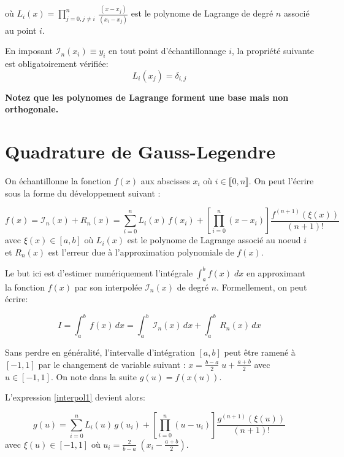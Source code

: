 \documentclass[a4paper, 10pt]{article}
\begin{document}
où $L_i(x) = \prod_{j=0, j \ne i}^n \,\frac{ (x-x_j) }{ (x_i-x_j) }$ est le polynome de Lagrange de degré $n$ associé au point $i$.

En imposant $\mathscr{I}_n(x_i) \equiv y_i$  en tout point d'échantillonnage $i$, la propriété suivante est obligatoirement vérifiée:
\begin{equation}
L_i(x_j)=\delta_{i,j}
\label{unite}
\end{equation}

\textbf{Notez que les polynomes de Lagrange  forment une base mais non orthogonale.}

\section{Quadrature de Gauss-Legendre}

On échantillonne la fonction $f(x)$ aux abscisses $x_i$ où $i \in  \llbracket  0, n  \rrbracket $.
On peut l'écrire sous la forme du développement suivant :

\begin{equation}
f(x) = \mathscr{I}_n(x) + R_n(x) = \sum_{i=0}^{n} L_i(x) \, f(x_i) + \left[ \prod_{i=0}^n (x-x_i) \right] \frac{f^{(n+1)}(\xi(x))}{(n+1)!}
\label{interpol1}
\end{equation}
avec $\xi(x) \in [a, b]$
où $L_i(x)$ est le polynome de Lagrange associé au noeud $i$ et $R_n(x)$ est l'erreur due à l'approximation polynomiale de $f(x)$.

Le but ici est d'estimer numériquement l'intégrale $\int_a^b f(x) \; dx$ en approximant la fonction $f(x)$ par son interpolée $\mathscr{I}_n(x)$
de degré $n$. Formellement, on peut écrire:

\begin{equation}
I=\int_a^b\, f(x)\, dx=\int_a^b\, \mathscr{I}_n(x)\, dx + \int_a^b\, R_n(x)\, dx
\end{equation}

Sans perdre en généralité, l'intervalle d'intégration $[a, b]$ peut être ramené à $[-1, 1]$ par le changement de variable suivant :
$x = \frac{b-a}{2} \; u + \frac{a+b}{2}$ avec $u \in [-1, 1]$. On note dans la suite $g(u) = f(x(u))$.

L'expression \ref{interpol1} devient alors:

\begin{equation}
g(u) =  \sum_{i=0}^{n} L_i(u) \, g(u_i) + \left[ \prod_{i=0}^n (u-u_i) \right] \frac{g^{(n+1)}(\xi(u))}{(n+1)!}
\label{interpol2}
\end{equation}
avec $\xi(u) \in [-1, 1]$ où $u_i = \frac{2}{b-a}\;  (x_i-\frac{a+b}{2})$.
\end{document}
